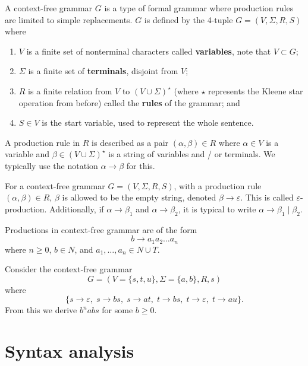 \begin{definition}
    A context-free grammar $G$ is a type of formal grammar where production rules are limited to simple replacements. $G$ is defined by the 4-tuple $G = (V, \Sigma, R, S)$ where 
    \begin{enumerate}
        \item $V$ is a finite set of nonterminal characters called \textbf{variables}, note that $V \subset G$;
        \item $\Sigma$ is a finite set of \textbf{terminals}, disjoint from $V$;
        \item $R$ is a finite relation from $V$ to $(V \cup \Sigma)^\star$ (where $\star$ represents the Kleene star operation from before) called the \textbf{rules} of the grammar; and
        \item $S \in V$ is the start variable, used to represent the whole sentence.
    \end{enumerate}
    A production rule in $R$ is described as a pair $(\alpha, \beta) \in R$ where $\alpha \in V$ is a variable and $\beta \in (V \cup \Sigma)^\star$ is a string of variables and / or terminals. We typically use the notation $\alpha \to \beta$ for this.
\end{definition}

\begin{remark}
    For a context-free grammar $G = (V, \Sigma, R, S)$, with a production rule $(\alpha, \beta) \in R$, $\beta$ is allowed to be the empty string, denoted $\beta \to \varepsilon$. This is called $\varepsilon$-production. Additionally, if $\alpha \to \beta_1$ and $\alpha \to \beta_2$, it is typical to write $\alpha \to \beta_1 \mid \beta_2$. 
\end{remark}

Productions in context-free grammar are of the form \[ b \to a_1 a_2 \ldots a_n \] where $n \geq 0$, $b \in N$, and $a_1, \ldots, a_n \in N \cup T$.

\begin{example}
    Consider the context-free grammar \[ G = (V = \{ s, t, u \}, \Sigma = \{ a, b \},  R, s) \] where \[ \{ s \to \varepsilon, \; s \to bs, \; s \to at, \; t \to bs, \; t \to \varepsilon, \; t \to au \}. \] From this we derive $b^nabs$ for some $b \geq 0$.
\end{example}

\section{Syntax analysis}

